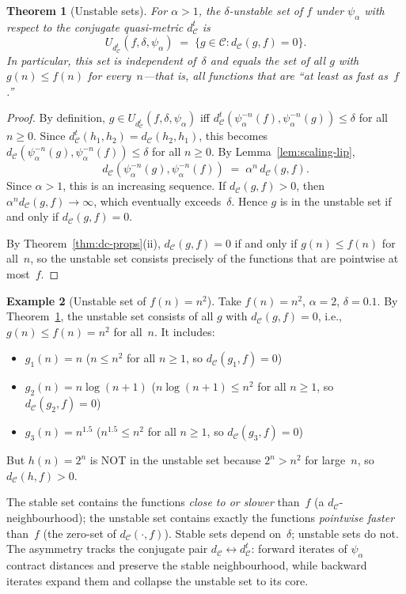 \documentclass[11pt,a4paper]{article}
\theoremstyle{plain}
\newtheorem{theoreminner}{Theorem}[section]
\theoremstyle{definition}
\newtheorem{exampleinner}[theoreminner]{Example}
\newenvironment{theorem}[1][]{\begin{theoreminner}[#1]}{\end{theoreminner}}
\newenvironment{example}[1][]{\begin{exampleinner}[#1]}{\end{exampleinner}}
\newcommand{\C}{\mathcal{C}}
\begin{document}
\begin{theorem}[Unstable sets]\label{thm:unstable-sets}
For $\alpha>1$, the $\delta$-unstable set of $f$ under $\psi_\alpha$
with respect to the \emph{conjugate} quasi-metric $d_\C^t$ is
\[
  U_{d_\C^t}(f,\delta,\psi_\alpha)
  \;=\; \{g\in\C : d_\C(g,f)=0\}.
\]
In particular, this set is independent of~$\delta$ and equals the set
of all $g$ with $g(n)\le f(n)$ for every~$n$---that is,
all functions that are ``at least as fast as~$f$.''
\end{theorem}

\begin{proof}
By definition,
$g\in U_{d_\C^t}(f,\delta,\psi_\alpha)$ iff
$d_\C^t(\psi_\alpha^{-n}(f),\psi_\alpha^{-n}(g))\le\delta$
for all $n\ge 0$.  Since
$d_\C^t(h_1,h_2)=d_\C(h_2,h_1)$, this becomes
$d_\C(\psi_\alpha^{-n}(g),\psi_\alpha^{-n}(f))\le\delta$ for all
$n\ge 0$.  By Lemma~\ref{lem:scaling-lip},
\[
  d_\C(\psi_\alpha^{-n}(g),\psi_\alpha^{-n}(f))
  \;=\;\alpha^n\,d_\C(g,f).
\]
Since $\alpha>1$, this is an increasing sequence.  If
$d_\C(g,f)>0$, then $\alpha^n d_\C(g,f)\to\infty$, which
eventually exceeds~$\delta$.  Hence $g$ is in the unstable set if and
only if $d_\C(g,f)=0$.

By Theorem~\ref{thm:dc-props}(ii), $d_\C(g,f)=0$ if and only if
$g(n)\le f(n)$ for all~$n$, so the unstable set consists precisely
of the functions that are pointwise at most~$f$.
\end{proof}

\begin{example}[Unstable set of $f(n)=n^2$]\label{ex:unstable-quad}
Take $f(n)=n^2$, $\alpha=2$, $\delta=0.1$. By Theorem~\ref{thm:unstable-sets},
the unstable set consists of all $g$ with $d_\C(g,f)=0$, i.e., $g(n)\le f(n)=n^2$
for all~$n$.  It includes:
\begin{itemize}
\item $g_1(n)=n$ ($n\le n^2$ for all $n\ge 1$, so $d_\C(g_1,f)=0$)
\item $g_2(n)=n\log(n+1)$ ($n\log(n+1)\le n^2$ for all $n\ge 1$, so $d_\C(g_2,f)=0$)
\item $g_3(n)=n^{1.5}$ ($n^{1.5}\le n^2$ for all $n\ge 1$, so $d_\C(g_3,f)=0$)
\end{itemize}
But $h(n)=2^n$ is NOT in the unstable set because $2^n>n^2$ for
large~$n$, so $d_\C(h,f)>0$.
\end{example}

\begin{insightbox}
The stable set contains the functions \emph{close to or slower}
than~$f$ (a $d_\C$-neighbourhood); the unstable set contains
exactly the functions \emph{pointwise faster} than~$f$ (the
zero-set of $d_\C(\cdot,f)$).  Stable sets depend on~$\delta$;
unstable sets do not.  The asymmetry tracks the conjugate pair
$d_\C\leftrightarrow d_\C^t$: forward iterates of $\psi_\alpha$
contract distances and preserve the stable neighbourhood, while
backward iterates expand them and collapse the unstable set to
its core.
\end{insightbox}
\end{document}
